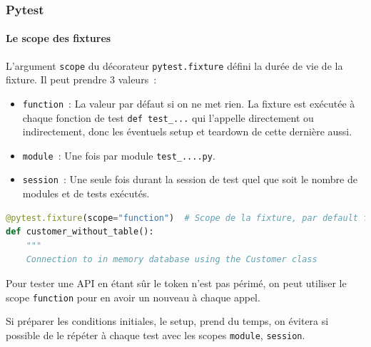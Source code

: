 \documentclass{beamer}
\begin{document}
    \begin{frame}[fragile]
        \frametitle{Pytest}
        \framesubtitle{Le scope des fixtures}
        \transdissolve
        L'argument \lstinline{scope} du décorateur \lstinline{pytest.fixture} défini la durée de vie
        de la fixture.
        Il peut prendre 3 valeurs~:
        \begin{itemize}
            \item \lstinline{function}~: La valeur par défaut si on ne met rien.
            La fixture est exécutée à chaque fonction de test \lstinline{def test_...} qui l'appelle directement ou indirectement, donc les éventuels setup et teardown de cette dernière aussi.
            \item \lstinline{module}~: Une fois par module \lstinline{test_....py}.
            \item \lstinline{session}~: Une seule fois durant la session de test quel que soit le nombre de modules et de tests exécutés.
        \end{itemize}
        \begin{lstlisting}[language=Python]
@pytest.fixture(scope="function")  # Scope de la fixture, par default function
def customer_without_table():
    """
    Connection to in memory database using the Customer class
        \end{lstlisting}

        Pour tester une API en étant sûr le token n'est pas périmé, on peut utiliser le scope \lstinline{function} pour en avoir un nouveau à chaque appel.

        Si préparer les conditions initiales, le setup, prend du temps, on évitera si possible de le répéter à chaque test avec les scopes \lstinline{module}, \lstinline{session}.
    \end{frame}
\end{document}
